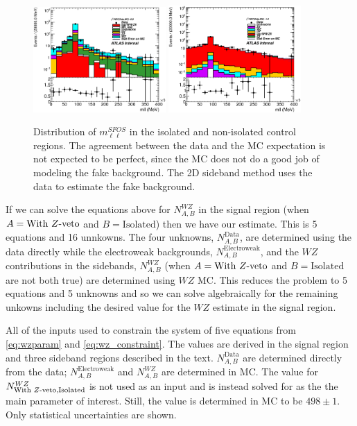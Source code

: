 \begin{figure}[htp]
\centering
\includegraphics[width=0.45\textwidth]{figures/WZ_CR/2DSideband_WZCR_Isolated}
\includegraphics[width=0.45\textwidth]{figures/WZ_CR/2DSideband_WZCR_NonIsolated}
\caption{ Distribution of $m_{\ell\ell}^{SFOS}$ in the isolated and  non-isolated 
control regions. The agreement between the data and the MC expectation
is not expected to be perfect, since the MC does not do a good job 
of modeling the fake background. The 2D sideband method uses the data
to estimate the fake background.}
\label{fig:wz_sidebands}
\end{figure}

If we can solve the equations above for $N^{WZ}_{A,B}$ in the signal region
(when $A=\textrm{With \ensuremath{Z}-veto}$ and $B=\textrm{Isolated}$)
then we have our estimate. 
This is 5 equations and 16 unnkowns. The four unknowns, $N^{\textrm{Data}}_{A,B}$,
are determined using the data directly while 
the electroweak backgrounds, $N^{\textrm{Electroweak}}_{A,B}$,
and the $WZ$ contributions in the sidebands, $N^{WZ}_{A,B}$ 
(when $A=\textrm{With \ensuremath{Z}-veto}$ and $B=\textrm{Isolated}$ are not both true)
are determined using $WZ$ MC. This reduces the problem to 5 equations
and 5 unknowns and so we can solve algebraically for the remaining unkowns
including the desired value for the $WZ$ estimate in the signal region.

\begin{table}
\centering

\caption{All of the inputs used to constrain the system of five equations
from \eqn\eqref{eq:wzparam} and \eqn\eqref{eq:wz_constraint}.
The values are derived in the signal region and three sideband regions
described in the text. $N^{\textrm{Data}}_{A,B}$ are determined directly
from the data; $N^{\textrm{Electroweak}}_{A,B}$ and $N^{WZ}_{A,B}$ are 
determined in MC. The value for $N^{WZ}_{\textrm{With \ensuremath{Z}-veto,Isolated}}$ is
not used as an input and is instead solved for as the the main
parameter of interest. Still, the value is determined in MC to be
$498 \pm 1$.  Only statistical uncertainties are shown.}
\label{tab:wz_input}
\end{table}


